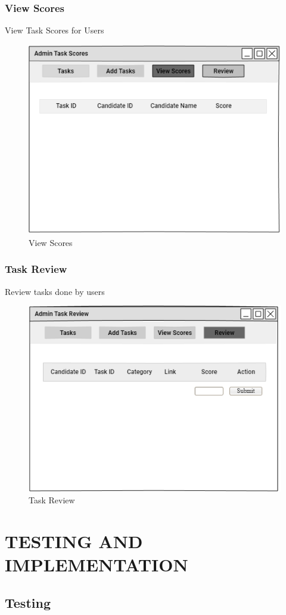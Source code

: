 \documentclass[a4paper,12pt]{report}
\begin{document}
\subsection {View Scores}
View Task Scores for Users
\begin{figure}[bph]
	\centering
	\includegraphics[width=.6\linewidth]{img/admin/admintaskviewscores}
	\caption{View Scores}
\end{figure}
\pagebreak

\subsection {Task Review}
Review tasks done by users
\begin{figure}[bph]
	\centering
	\includegraphics[width=.8\linewidth]{img/admin/admintaskreview}
	\caption{Task Review}
\end{figure}

\pagebreak

\chapter{TESTING AND IMPLEMENTATION}

\section{Testing}
\end{document}
